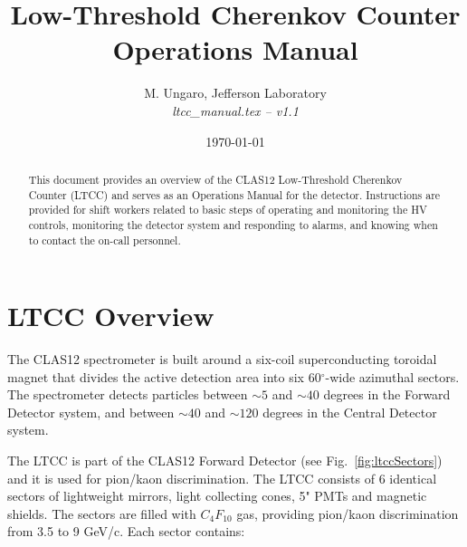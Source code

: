 \documentclass{article}
\begin{document}
\title{Low-Threshold Cherenkov Counter Operations Manual}

\vskip 1cm

\author{M. Ungaro, Jefferson Laboratory\\[0.2ex]
{\it ltcc\_manual.tex -- v1.1}}

\date \today
%
\maketitle

\begin{abstract}
This document provides an overview of the CLAS12 Low-Threshold Cherenkov Counter (LTCC) and serves 
as an Operations Manual for the detector. Instructions are provided for shift workers related to 
basic steps of operating and monitoring the HV controls, monitoring the detector system and 
responding to alarms, and knowing when to contact the on-call personnel. 

%

\end{abstract}

\thispagestyle{empty}


\tableofcontents

\clearpage

\section{LTCC Overview}
\label{intro}

The CLAS12 spectrometer is built around a six-coil superconducting toroidal magnet that divides the 
active detection area into six 60$^\circ$-wide azimuthal sectors. 
The spectrometer detects particles between $\sim 5$ and $\sim 40$ degrees in the Forward Detector system, and
between $\sim 40$ and $\sim 120$ degrees in the Central Detector system.

The LTCC is part of the CLAS12 Forward Detector (see Fig.~\ref{fig:ltccSectors}) and it is used for  pion/kaon discrimination. 
The LTCC consists of 6 identical sectors of lightweight mirrors, light collecting cones, 5" PMTs and magnetic shields. 
The sectors are filled with $C_4F_{10}$ gas, providing pion/kaon discrimination from 3.5 to 9 GeV/c. 
Each sector contains:
\end{document}
